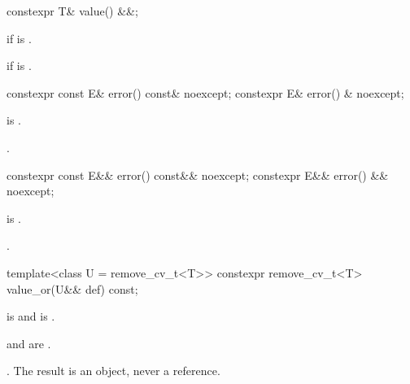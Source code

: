 %
\begin{itemdecl}
constexpr T& value() &&;
\end{itemdecl}

\begin{itemdescr}
\pnum
\returns
{} if  is .

\pnum
\throws
{} if  is .
\end{itemdescr}

%
\begin{itemdecl}
constexpr const E& error() const& noexcept;
constexpr E& error() & noexcept;
\end{itemdecl}

\begin{itemdescr}
\pnum
\expects
{} is .

\pnum
\returns
{}.
\end{itemdescr}

%
\begin{itemdecl}
constexpr const E&& error() const&& noexcept;
constexpr E&& error() && noexcept;
\end{itemdecl}

\begin{itemdescr}
\pnum
\expects
{} is .

\pnum
\returns
{}.
\end{itemdescr}

%
\begin{itemdecl}
template<class U = remove_cv_t<T>> constexpr remove_cv_t<T> value_or(U&& def) const;
\end{itemdecl}

\begin{itemdescr}
\pnum
\constraints
{} is  and  is .

\pnum
\mandates
{} and  are .

\pnum
\returns
{}. The result is an object, never a reference.
\end{itemdescr}

